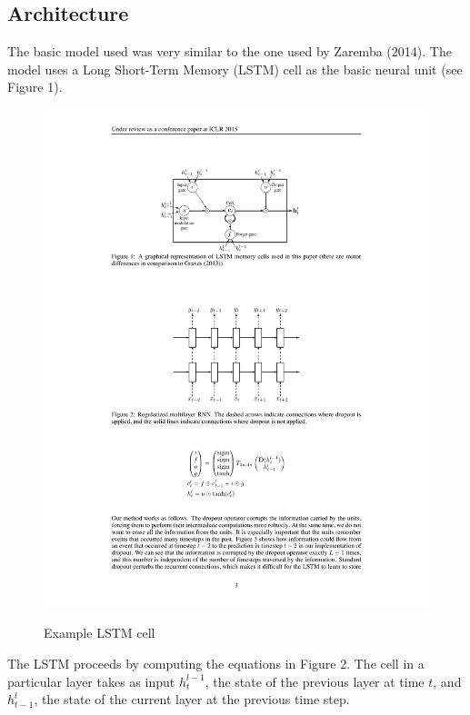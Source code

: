\documentclass{article} %
\begin{document}
\subsection{Architecture}
The basic model used was very similar to the one used by Zaremba (2014). The model uses a Long Short-Term Memory (LSTM) cell as the basic neural unit (see Figure 1). 
\begin{figure}
	\includegraphics[width=\textwidth]{LSTMcell}
        \label{fig1}
        \caption{Example LSTM cell}
\end{figure}
The LSTM proceeds by computing the equations in Figure 2. The cell in a particular layer takes as input $h_t^{l-1}$, the state of the previous layer at time $t$, and $h_{t-1}^l$, the state of the current layer at the previous time step.
\end{document}
